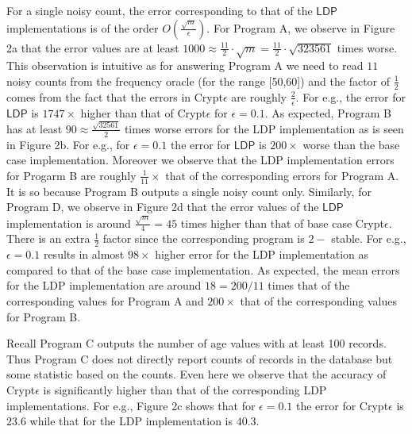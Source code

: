  For a single noisy count, the error corresponding to that of the $\textsf{LDP}$ implementations is of the order $O(\frac{\sqrt{m}}{\epsilon})$. For Program A, we observe in Figure 2a that the error values are at least $1000 \approx \frac{11}{2}\cdot \sqrt{m}=  \frac{11}{2}\cdot \sqrt{323561}$ times worse. This observation is intuitive as for answering Program A we need to read $11$ noisy counts from the frequency oracle (for the range [50,60]) and the factor of $\frac{1}{2}$ comes from the fact that the errors in Crypt$\epsilon$ are roughly $\frac{2}{\epsilon}$. For e.g., the error for $\textsf{LDP}$ is $1747 \times$  higher than that of Crypt$\epsilon$ for $\epsilon=0.1$. As expected, Program B has at least $90 \approx \frac{\sqrt{32561}}{2}$ times worse errors for the \textsf{LDP} implementation as is seen in Figure 2b. For e.g., for $\epsilon=0.1$ the error for $\textsf{LDP}$ is $200\times $ worse than the base case \system implementation. Moreover we observe that the \textsf{LDP} implementation errors for Progarm B are roughly $\frac{1}{11}\times$ that of the corresponding errors for Program A. It is so because Program B outputs a single noisy count only. Similarly, for Program D, we observe in Figure 2d that the error values of the $\textsf{LDP}$ implementation is around $\frac{\sqrt{m}}{4}=45 $ times higher than that of base case Crypt$\epsilon$. There is an extra $\frac{1}{2}$ factor since  the corresponding \system program is $2-$ stable. For e.g., $\epsilon=0.1$ results in almost $98 \times$ higher error for the \textsf{LDP} implementation as compared to that of the base case \system implementation. As expected, the mean errors for the \textsf{LDP} implementation are around $18 = 200/11$ times that of the corresponding values for Program A and $200\times$ that of the corresponding values for Program B.
\par
Recall Program C outputs the number of age values with at least 100 records. Thus Program C does not directly report counts of records in the database but some statistic based on the counts. Even here we observe that the accuracy of Crypt$\epsilon$ is significantly higher than that of the corresponding \textsf{LDP} implementations. For e.g., Figure 2c shows that for $\epsilon=0.1$ the error for Crypt$\epsilon$ is $23.6$ while that for the \textsf{LDP} implementation is $40.3$. \\
\\
